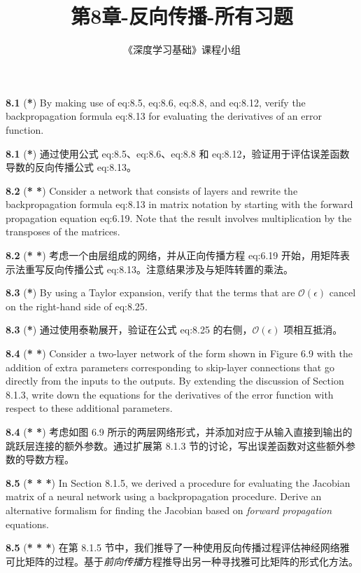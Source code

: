 \documentclass{article}
\title{第8章-反向传播-所有习题}
\author{《深度学习基础》课程小组}
\begin{document}
\maketitle

\textbf{8.1} (\textbf{*}) By making use of {eq:8.5}, {eq:8.6}, {eq:8.8}, and {eq:8.12}, verify the backpropagation formula {eq:8.13} for evaluating the derivatives of an error function.

\textbf{8.1} (\textbf{*}) 通过使用公式 {eq:8.5}、{eq:8.6}、{eq:8.8} 和 {eq:8.12}，验证用于评估误差函数导数的反向传播公式 {eq:8.13}。

\textbf{8.2} (\textbf{* *}) Consider a network that consists of layers and rewrite the backpropagation formula {eq:8.13} in matrix notation by starting with the forward propagation equation {eq:6.19}. Note that the result involves multiplication by the transposes of the matrices.

\textbf{8.2} (\textbf{* *}) 考虑一个由层组成的网络，并从正向传播方程 {eq:6.19} 开始，用矩阵表示法重写反向传播公式 {eq:8.13}。注意结果涉及与矩阵转置的乘法。

\textbf{8.3} (\textbf{*}) By using a Taylor expansion, verify that the terms that are $\mathcal{O}(\epsilon)$ cancel on the right-hand side of {eq:8.25}.

\textbf{8.3} (\textbf{*}) 通过使用泰勒展开，验证在公式 {eq:8.25} 的右侧，$\mathcal{O}(\epsilon)$ 项相互抵消。

\textbf{8.4} (\textbf{* *}) Consider a two-layer network of the form shown in Figure 6.9 with the addition of extra parameters corresponding to skip-layer connections that go directly from the inputs to the outputs. By extending the discussion of Section 8.1.3, write down the equations for the derivatives of the error function with respect to these additional parameters.

\textbf{8.4} (\textbf{* *}) 考虑如图 6.9 所示的两层网络形式，并添加对应于从输入直接到输出的跳跃层连接的额外参数。通过扩展第 8.1.3 节的讨论，写出误差函数对这些额外参数的导数方程。

\textbf{8.5} (\textbf{* * *}) In Section 8.1.5, we derived a procedure for evaluating the Jacobian matrix of a neural network using a backpropagation procedure. Derive an alternative formalism for finding the Jacobian based on \emph{forward propagation} equations.

\textbf{8.5} (\textbf{* * *}) 在第 8.1.5 节中，我们推导了一种使用反向传播过程评估神经网络雅可比矩阵的过程。基于\emph{前向传播}方程推导出另一种寻找雅可比矩阵的形式化方法。
\end{document}
